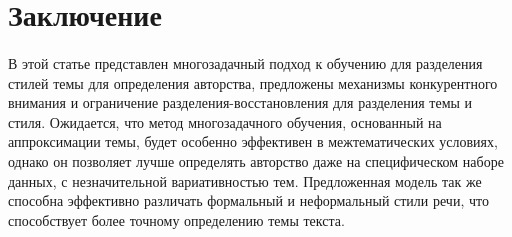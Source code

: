 \section{Заключение}
\paragraph*{} В этой статье представлен многозадачный подход 
к обучению для разделения стилей темы для определения 
авторства, предложены механизмы конкурентного внимания 
и ограничение разделения-восстановления 
для разделения темы и стиля. Ожидается, 
что метод многозадачного обучения, основанный на аппроксимации темы, будет особенно эффективен в межтематических условиях, однако он позволяет лучше определять 
авторство даже на специфическом наборе 
данных, с незначительной вариативностью 
тем. Предложенная модель так же способна 
эффективно различать формальный и неформальный стили речи, что способствует более 
точному определению темы текста. 